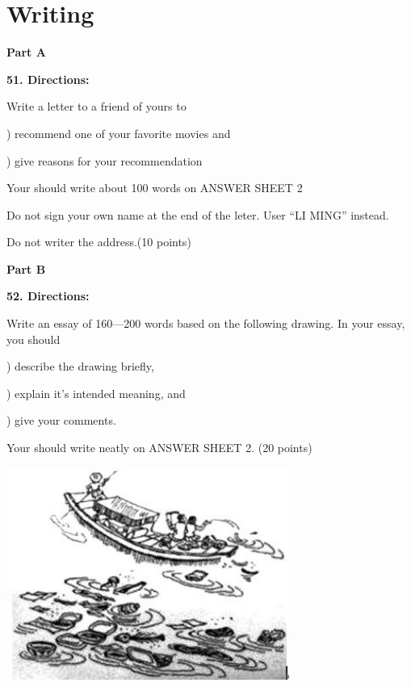 
\section{Writing}
\textbf{Part A}

\textbf{51. Directions:}

\qquad Write a letter to a friend of yours to

) recommend one of your favorite movies and

) give reasons for your recommendation

\qquad Your should write about 100 words on ANSWER SHEET 2

\qquad Do not sign your own name at the end of the leter. User ``LI MING'' instead.

\qquad Do not writer the address.(10 points)

\vspace{10pt}

\textbf{Part B}

\textbf{52. Directions:}

\qquad Write an essay of 160---200 words based on the following drawing. In your essay, you should

) describe the drawing briefly,

) explain it’s intended meaning, and

) give your comments.

\qquad Your should write neatly on ANSWER SHEET 2. (20 points)

\begin{center}\includegraphics[height=7cm]{8.jpg}\end{center}